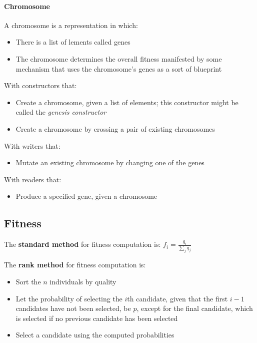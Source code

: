 \documentclass{article}
\begin{document}
\paragraph{Chromosome} A chromosome is a representation in which:
\begin{itemize}
  \item There is a list of lements called genes
  \item The chromosome determines the overall fitness manifested by
    some mechanism that uses the chromosome's genes as a sort of
    blueprint
\end{itemize}
With constructors that:
\begin{itemize}
  \item Create a chromosome, given a list of elements; this
    constructor might be called the \textit{genesis constructor}
  \item Create a chromosome by crossing a pair of existing
    chromosomes
\end{itemize}
With writers that:
\begin{itemize}
  \item Mutate an existing chromosome by changing one of the genes
\end{itemize}
With readers that:
\begin{itemize}
  \item Produce a specified gene, given a chromosome
\end{itemize}

\subsection{Fitness}

The \textbf{standard method} for fitness computation is:
\begin{math}
  f_i = \frac{q_i}{\sum_{j}{q_j}}
\end{math}

The \textbf{rank method} for fitness computation is:
\begin{itemize}
  \item Sort the $n$ individuals by quality
  \item Let the probability of selecting the $i$th candidate, given
    that the first $i-1$ candidates have not been selected, be $p$,
    except for the final candidate, which is selected if no
    previous candidate has been selected
  \item Select a candidate using the computed probabilities
\end{itemize}
\end{document}
